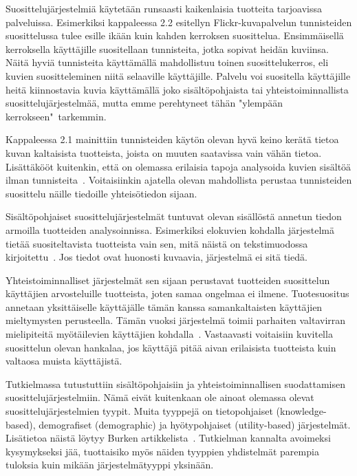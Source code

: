 \documentclass[12pt,finnish]{tktltiki2}
\theoremstyle{definition}
\theoremstyle{remark}
\begin{document}
Suosittelujärjestelmiä käytetään runsaasti kaikenlaisia tuotteita tarjoavissa palveluissa. Esimerkiksi kappaleessa 2.2 esitellyn Flickr-kuvapalvelun tunnisteiden suosittelussa tulee esille ikään kuin kahden kerroksen suosittelua. Ensimmäisellä kerroksella käyttäjille suositellaan tunnisteita, jotka sopivat heidän kuviinsa. Näitä hyviä tunnisteita käyttämällä mahdollistuu toinen suosittelukerros, eli kuvien suositteleminen niitä selaaville käyttäjille. Palvelu voi suositella käyttäjille heitä kiinnostavia kuvia käyttämällä joko sisältöpohjaista tai yhteistoiminnallista suosittelujärjestelmää, mutta emme perehtyneet tähän "ylempään kerrokseen"\ tarkemmin.

Kappaleessa 2.1 mainittiin tunnisteiden käytön olevan hyvä keino kerätä tietoa kuvan kaltaisista tuotteista, joista on muuten saatavissa vain vähän tietoa. Lisättäkööt kuitenkin, että on olemassa erilaisia tapoja analysoida kuvien sisältöä ilman tunnisteita~\cite{Sigurbjornsson:2008:FTR:1367497.1367542}. Voitaisiinkin ajatella olevan mahdollista perustaa tunnisteiden suosittelu näille tiedoille yhteisötiedon sijaan.

Sisältöpohjaiset suosittelujärjestelmät tuntuvat olevan sisällöstä annetun tiedon armoilla tuotteiden analysoinnissa. Esimerkiksi elokuvien kohdalla järjestelmä tietää suositeltavista tuotteista vain sen, mitä näistä on tekstimuodossa kirjoitettu~\cite{Ullman}. Jos tiedot ovat huonosti kuvaavia, järjestelmä ei sitä tiedä. 

Yhteistoiminnalliset järjestelmät sen sijaan perustavat tuotteiden suosittelun käyttäjien arvosteluille tuotteista, joten samaa ongelmaa ei ilmene. Tuotesuositus annetaan yksittäiselle käyttäjälle tämän kanssa samankaltaisten käyttäjien mieltymysten perusteella. Tämän vuoksi järjestelmä toimii parhaiten valtavirran mielipiteitä myötäilevien käyttäjien kohdalla~\cite{Burke:2002:HRS:586321.586352}. Vastaavasti voitaisiin kuvitella suosittelun olevan hankalaa, jos käyttäjä pitää aivan erilaisista tuotteista kuin valtaosa muista käyttäjistä.


Tutkielmassa tutustuttiin sisältöpohjaisiin ja yhteistoiminnallisen suodattamisen suosittelujärjestelmiin. Nämä eivät kuitenkaan ole ainoat olemassa olevat suosittelujärjestelmien tyypit. Muita tyyppejä on tietopohjaiset (knowledge-based), demografiset (demographic) ja hyötypohjaiset (utility-based) järjestelmät. Lisätietoa näistä löytyy Burken artikkelista~\cite{Burke:2002:HRS:586321.586352}. Tutkielman kannalta avoimeksi kysymykseksi jää, tuottaisiko myös näiden tyyppien yhdistelmät parempia tuloksia kuin mikään järjestelmätyyppi yksinään.
\end{document}

